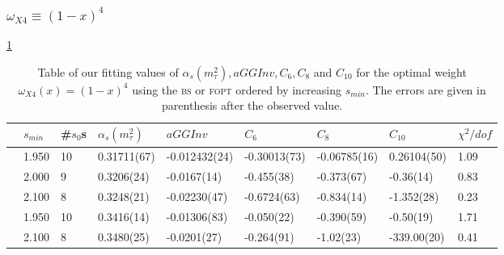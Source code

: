 \documentclass[../../index.tex]{subfiles}
\begin{document}
\subsubsection{\(\omega_{X4} \equiv (1-x)^4\)}
\cref{table:fitOpt40AlD4D6D8D10}
\begin{table}
  \centering
  \begin{adjustbox}{width=\textwidth}
    \begin{tabular}{lllllllll}
      \toprule
      & \(s_{min}\) & \#\(s_0\)s & \(\alpha_s(m_\tau^2)\) & \(aGGInv\) & \(C_{6}\) & \(C_{8}\) & \(C_{10}\) & \(\chi^2/dof\)  \\
      \midrule
      \parbox[t]{2mm}{} & 1.950 & 10 & 0.31711(67) & -0.012432(24) & -0.30013(73) & -0.06785(16) & 0.26104(50) & 1.09 \\
      & 2.000 & 9 & 0.3206(24) & -0.0167(14) & -0.455(38) & -0.373(67) & -0.36(14) & 0.83 \\
      & 2.100 & 8 & 0.3248(21) & -0.02230(47) & -0.6724(63) & -0.834(14) & -1.352(28) & 0.23 \\
      \midrule
      \parbox[t]{2mm}{} & 1.950 & 10 & 0.3416(14) & -0.01306(83) & -0.050(22) & -0.390(59) & -0.50(19) & 1.71 \\
      & 2.100 & 8 & 0.3480(25) & -0.0201(27) & -0.264(91) & -1.02(23) & -339.00(20) & 0.41 \\
      \bottomrule
    \end{tabular}
  \end{adjustbox}
  \caption{Table of our fitting values of \(\alpha_s(m_\tau^2), aGGInv, C_6,
    C_8\) and \(C_{10}\) for the optimal weight \(\omega_{X4}(x)=(1-x)^4\) using
    the \textsc{bs} or \textsc{fopt} ordered by increasing \(s_{min}\). The
    errors are given in parenthesis after the observed value.}
  \label{table:fitOpt40AlD4D6D8D10}
\end{table}
\end{document}

